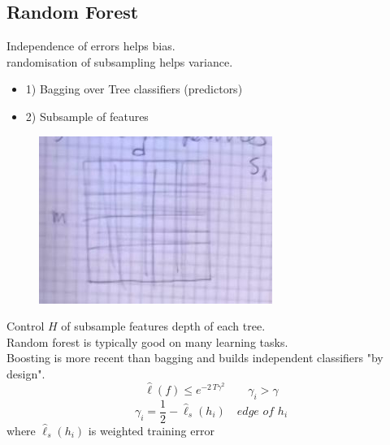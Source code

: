 \documentclass[../main.tex]{subfiles}
\begin{document}
\subsection{Random Forest}
Independence of errors helps bias.\\ randomisation of subsampling helps variance.
\begin{itemize}
\item 1) Bagging over Tree classifiers (predictors)
\item 2) Subsample of features\\
\end{itemize}
\begin{figure}[h]
    \centering
    \includegraphics[width=0.3\linewidth]{../img/lez22-img2.JPG}
    \caption{}
\end{figure}
Control $H$ of subsample features depth of each tree.
\\Random forest is typically good on many learning tasks.
\\
Boosting is more recent than bagging and builds independent classifiers "by design". 
$$ \hat{\ell}(f) \leq e^{-2 \, T \gamma^2} \qquad \gamma_i> \gamma$$
$$ \gamma_i = \frac{1}{2}-\hat{\ell}_s(h_i) \quad \textit{edge of $h_i$}
$$
where $ \hat{\ell}_s(h_i)$ is weighted training error
\end{document}
